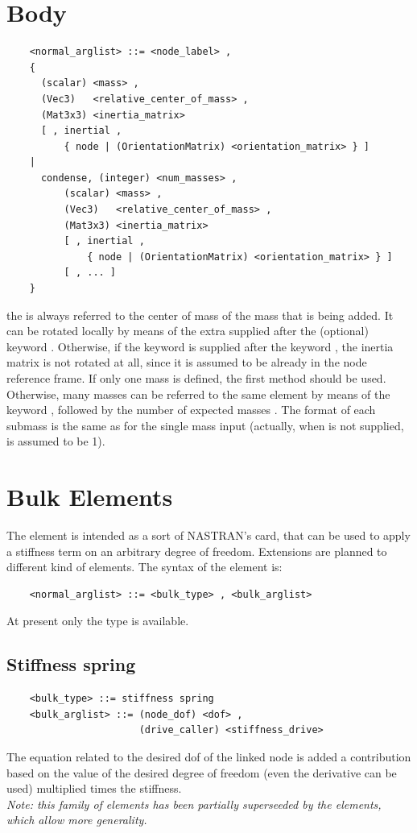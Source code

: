 \section{Body}
\begin{verbatim}
    <normal_arglist> ::= <node_label> , 
    { 
      (scalar) <mass> , 
      (Vec3)   <relative_center_of_mass> ,
      (Mat3x3) <inertia_matrix>
      [ , inertial , 
          { node | (OrientationMatrix) <orientation_matrix> } ]
    |
      condense, (integer) <num_masses> ,
          (scalar) <mass> , 
          (Vec3)   <relative_center_of_mass> ,
          (Mat3x3) <inertia_matrix> 
          [ , inertial , 
              { node | (OrientationMatrix) <orientation_matrix> } ]
          [ , ... ]
    }
\end{verbatim}
the  is always referred to the center of mass of the
mass that is being added. It can be rotated locally by means of the extra
 supplied after the (optional) keyword .
Otherwise, if the keyword  is supplied after the keyword 
, the inertia matrix is not rotated at all, since it is
assumed to be already in the node reference frame.
If only one mass is defined, the first method should be used. Otherwise,
many masses can be referred to the same element by means of the keyword
, followed by the number of expected masses .
The format of each submass is the same as for the single mass input (actually, 
when  is not supplied,  is assumed to be 1).




\section{Bulk Elements}
The  element is intended as a sort of NASTRAN's  card,
that can be used to apply a stiffness term on an arbitrary degree of freedom.
Extensions are planned to different kind of elements.
The syntax of the  element is:
\begin{verbatim}
    <normal_arglist> ::= <bulk_type> , <bulk_arglist>
\end{verbatim}
At present only the  type is available.

\subsection{Stiffness spring}
\begin{verbatim}
    <bulk_type> ::= stiffness spring
    <bulk_arglist> ::= (node_dof) <dof> ,
                       (drive_caller) <stiffness_drive>
\end{verbatim}
The equation related to the desired dof of the linked node is added a
contribution based on the value of the desired degree of freedom (even the
derivative can be used) multiplied times the stiffness. \\
{\em Note: this family of elements has been partially superseeded by the
 elements, which allow more generality.}




